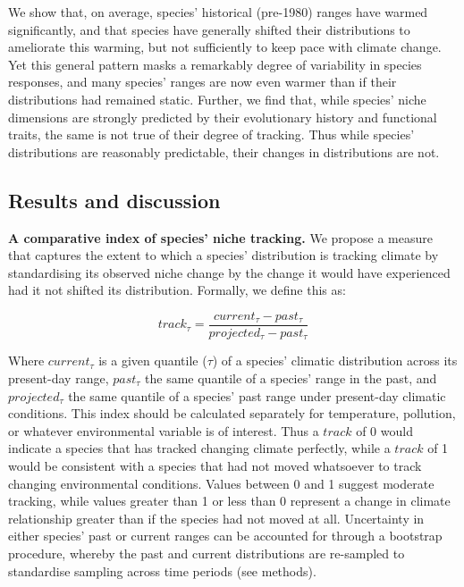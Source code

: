 \documentclass[12pt]{report}
\begin{document}
We show that, on average, species' historical (pre-1980) ranges have
warmed significantly, and that species have generally shifted their
distributions to ameliorate this warming, but not sufficiently to keep
pace with climate change. Yet this general pattern masks a remarkably
degree of variability in species responses, and many species' ranges
are now even warmer than if their distributions had remained
static. Further, we find that, while species' niche dimensions are
strongly predicted by their evolutionary history and functional
traits, the same is not true of their degree of tracking. Thus while
species' distributions are reasonably predictable, their changes in
distributions are not.

\clearpage
\subsection*{Results and discussion}
\textbf{A comparative index of species' niche tracking.} We propose a
measure that captures the extent to which a species' distribution is
tracking climate by standardising its observed niche change by the
change it would have experienced had it not shifted its
distribution. Formally, we define this as:

\begin{equation}
  track_\tau = \frac{current_\tau - past_\tau}{projected_\tau - past_\tau}
\end{equation}

Where $current_\tau$ is a given quantile ($\tau$) of a species'
climatic distribution across its present-day range, $past_\tau$ the
same quantile of a species' range in the past, and $projected_\tau$
the same quantile of a species' past range under present-day climatic
conditions. This index should be calculated separately for
temperature, pollution, or whatever environmental variable is of
interest. Thus a $track$ of 0 would indicate a species that has
tracked changing climate perfectly, while a $track$ of 1 would be
consistent with a species that had not moved whatsoever to track
changing environmental conditions. Values between 0 and 1 suggest
moderate tracking, while values greater than 1 or less than 0
represent a change in climate relationship greater than if the species
had not moved at all. Uncertainty in either species' past or current
ranges can be accounted for through a bootstrap procedure, whereby the
past and current distributions are re-sampled to standardise sampling
across time periods (see methods).
\end{document}
